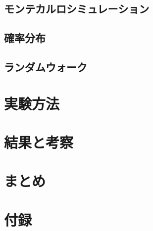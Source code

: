 \documentclass[dvipdfmx]{jsarticle}
\begin{document}
\subsection{モンテカルロシミュレーション}
\subsection{確率分布}
\subsection{ランダムウォーク}

\section{実験方法}
\section{結果と考察}
\section{まとめ}
\section{付録}
\end{document}
